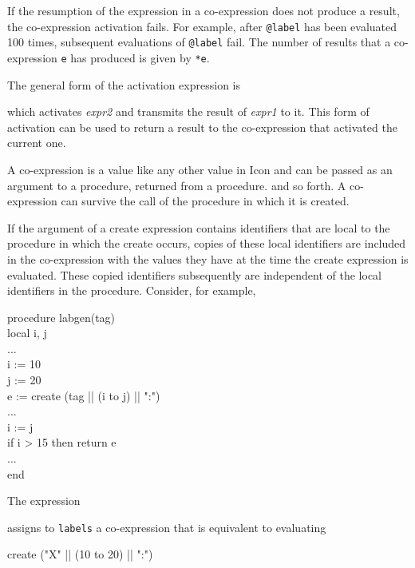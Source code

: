 If the resumption of the expression in a co-expression does not
produce a result, the co-expression activation fails.  For example,
after \texttt{@label} has been evaluated 100 times, subsequent
evaluations of \texttt{@label} fail. The number of results that a
co-expression \texttt{e} has produced is given by \texttt{*e}.

The general form of the activation expression is


\noindent which activates \textit{expr2} and transmits the result of
\textit{expr1} to it. This form of activation can be used to return a
result to the co-expression that activated the current one.

A co-expression is a value like any other value in Icon and can be
passed as an argument to a procedure, returned from a procedure. and
so forth. A co-expression can survive the call of the procedure in
which it is created.

If the argument of a create expression contains identifiers that are
local to the procedure in which the create occurs, copies of these
local identifiers are included in the co-expression with the values
they have at the time the create expression is evaluated. These copied
identifiers subsequently are independent of the local identifiers in
the procedure. Consider, for example,

\begin{iconcode}
procedure labgen(tag)\\
\>local i, j\\
\> ...\\
\> i := 10\\
\> j := 20\\
\> e := create (tag || (i to j) || ":")\\
\> ...\\
\> i := j\\
\> if i > 15 then return e\\
\> ...\\
end
\end{iconcode}

The expression


\noindent assigns to \texttt{labels} a co-expression that is
equivalent to evaluating

\begin{iconcode}
\>create ("X" || (10 to 20) || ":")
\end{iconcode}

